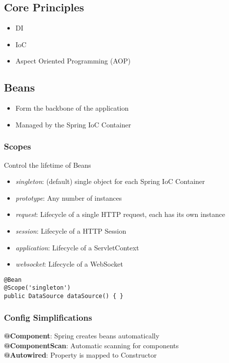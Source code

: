 \subsection{Core Principles}
\begin{itemize}
    \item DI
    \item IoC
    \item Aspect Oriented Programming (AOP)
\end{itemize}

\subsection{Beans}
\begin{itemize}
    \item Form the backbone of the application
    \item Managed by the Spring IoC Container
\end{itemize}
\subsubsection{Scopes}
Control the lifetime of Beans
\begin{itemize}
    \item \textit{singleton}: (default) single object for each Spring IoC Container
    \item \textit{prototype}: Any number of instances
    \item \textit{request}: Lifecycle of a single HTTP request, each has its own instance
    \item \textit{session}: Lifecycle of a HTTP Session
    \item \textit{application}: Lifecycle of a ServletContext 
    \item \textit{websocket}: Lifecycle of a WebSocket
\end{itemize}
\begin{lstlisting}
@Bean 
@Scope('singleton')
public DataSource dataSource() { }
\end{lstlisting}

\subsubsection{Config Simplifications}
\textbf{@Component}: Spring creates beans automatically\\ 
\textbf{@ComponentScan}: Automatic scanning for components\\
\textbf{@Autowired}: Property is mapped to Constructor

